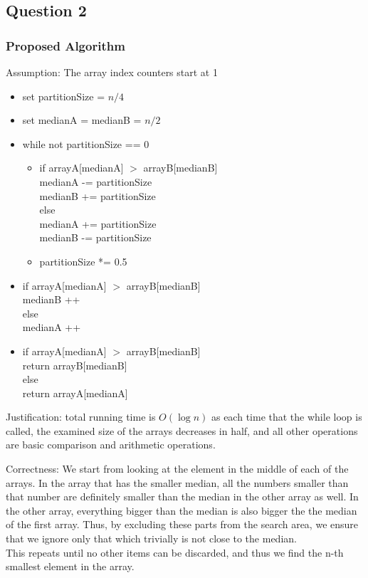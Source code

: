 \documentclass{article}
\begin{document}
\subsection*{Question 2}
\subsubsection*{Proposed Algorithm}
Assumption: The array index counters start at 1
\begin{itemize}
  \item set partitionSize = $n/4$
  \item set medianA = medianB = $n/2$
  \item while not partitionSize == 0
  \begin{itemize}
    \item if arrayA[medianA] $>$ arrayB[medianB]\\
    medianA -= partitionSize\\
    medianB += partitionSize\\
    else\\
    medianA += partitionSize\\
    medianB -= partitionSize
    \item partitionSize *= 0.5
  \end{itemize}
  \item if arrayA[medianA] $>$ arrayB[medianB]\\
  medianB ++\\
  else\\
  medianA ++
  \item if arrayA[medianA] $>$ arrayB[medianB]\\
  return arrayB[medianB]\\
  else\\
  return arrayA[medianA]
\end{itemize}

Justification: total running time is $O(\log n)$ as each time that the while
loop is called, the examined size of the arrays decreases in half, and all other
operations are basic comparison and arithmetic operations.

Correctness: We start from looking at the element in the middle of each of the
arrays. In the array that has the smaller median, all the  numbers smaller than
that number are definitely smaller than the median in the other array as well.
In the other array, everything bigger than the median is also bigger the the median of
the first array. Thus, by excluding these parts from the search area, we ensure
that we ignore only that which trivially is not close to the median.\\
This repeats until no other items can be discarded, and thus we find the n-th
smallest element in the array.
\clearpage
\end{document}

